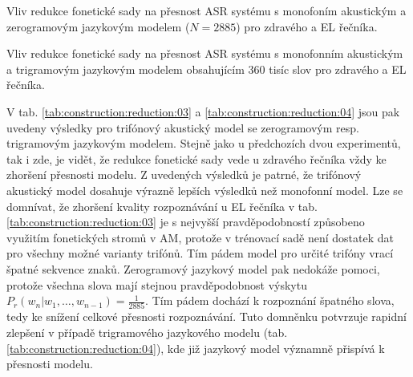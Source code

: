 \begin{table}[htpb]
  \centering
  \def\arraystretch{1.5}
  \caption[Vliv redukce na přesnost ASR s mono. AM. a zerogram LM.]{Vliv redukce fonetické sady na přesnost ASR systému s monofoním akustickým a zerogramovým jazykovým modelem ($N=2885$) pro zdravého a EL řečníka.}
  \label{tab:construction:reduction:01}
\end{table}

\begin{table}[htpb]
  \centering
  \def\arraystretch{1.5}
  \caption[Vliv redukce na přesnost ASR s mono. AM. a 3-gram LM (N=360k).]{Vliv redukce fonetické sady na přesnost ASR systému s monofonním akustickým a trigramovým jazykovým modelem obsahujícím 360 tisíc slov pro zdravého a EL řečníka.}
  \label{tab:construction:reduction:02}
\end{table}


V tab. \ref{tab:construction:reduction:03} a \ref{tab:construction:reduction:04} jsou pak uvedeny výsledky pro trifónový akustický model se zerogramovým resp. trigramovým jazykovým modelem.
Stejně jako u předchozích dvou experimentů, tak i zde, je vidět, že redukce fonetické sady vede u zdravého řečníka vždy ke zhoršení přesnosti modelu.
Z uvedených výsledků je patrné, že trifónový akustický model dosahuje výrazně lepších výsledků než monofonní model.
Lze se domnívat, že zhoršení kvality rozpoznávání u EL řečníka v tab. \ref{tab:construction:reduction:03} je s nejvyšší pravděpodobností způsobeno využitím fonetických stromů v AM, protože v trénovací sadě není dostatek dat pro všechny možné varianty trifónů.
Tím pádem model pro určité trifóny vrací špatné sekvence znaků.
Zerogramový jazykový model pak nedokáže pomoci, protože všechna slova mají stejnou pravděpodobnost výskytu $P_r(w_n|w_1,\dots,w_{n-1}) = \frac{1}{2885}$.
Tím pádem dochází k rozpoznání špatného slova, tedy ke snížení celkové přesnosti rozpoznávání.
Tuto domněnku potvrzuje rapidní zlepšení v případě trigramového jazykového modelu (tab. \ref{tab:construction:reduction:04}), kde již jazykový model významně přispívá k přesnosti modelu.

